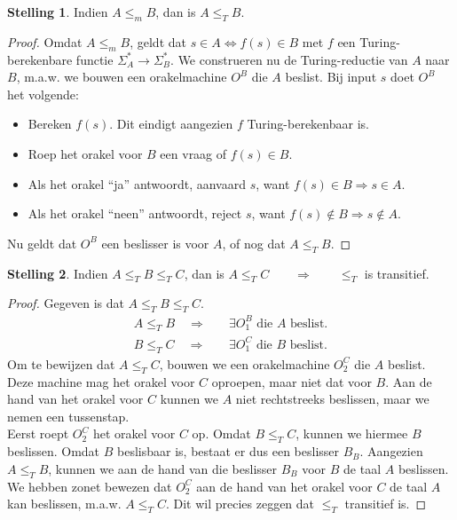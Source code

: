 \documentclass[kulak]{kulakarticle}
\theoremstyle{definition}
\newtheorem*{stelling}{Stelling}
\begin{document}
	\begin{stelling}
		Indien \(A \leq_m B\), dan is \(A \leq_T B\).
	\end{stelling}

	\begin{proof}
		Omdat \(A \leq_m B\), geldt dat \(s\in A \Leftrightarrow f(s)\in B\) met \( f \) een Turing-berekenbare functie \(\Sigma_A^*\to\Sigma_B^*\). We construeren nu de Turing-reductie van \(A\) naar \(B\), m.a.w. we bouwen een orakelmachine \(O^B\) die \(A\) beslist. Bij input \(s\) doet \(O^B\) het volgende:
		\begin{itemize}
			\item Bereken \(f(s)\). Dit eindigt aangezien \(f\) Turing-berekenbaar is.
			\item Roep het orakel voor \(B\) een vraag of \(f(s)\in B\).
			\item Als het orakel ``ja'' antwoordt, aanvaard \(s\), want \(f(s)\in B \Rightarrow s\in A\).
			\item Als het orakel ``neen'' antwoordt, reject \(s\), want \(f(s)\notin B \Rightarrow s\notin A\).
		\end{itemize}
		Nu geldt dat \(O^B\) een beslisser is voor \(A\), of nog dat \(A \leq_T B\).
	\end{proof}

	\newpage
	\begin{stelling}
		Indien \(A \leq_T B \leq_T C\), dan is \(A \leq_T C \qquad \Longrightarrow \qquad \leq_T\) is transitief.
	\end{stelling}

	\begin{proof} Gegeven is dat \(A \leq_T B \leq_T C\).
		\begin{align*}
			A \leq_T B \quad \Longrightarrow \quad &\exists O_1^B \text{ die $A$ beslist}.\\
			B \leq_T C \quad \Longrightarrow \quad &\exists O_1^C \text{ die $B$ beslist}.
		\end{align*}
		Om te bewijzen dat \(A \leq_T C\), bouwen we een orakelmachine \(O_2^C\) die \(A\) beslist. Deze machine mag het orakel voor \(C\) oproepen, maar niet dat voor \(B\). Aan de hand van het orakel voor \(C\) kunnen we \(A\) niet rechtstreeks beslissen, maar we nemen een tussenstap. \hfill \\

		Eerst roept \(O_2^C\) het orakel voor \(C\) op. Omdat \(B \leq_T C\), kunnen we hiermee \(B\) beslissen. Omdat \(B\) beslisbaar is, bestaat er dus een beslisser \(B_B\). Aangezien \(A \leq_T B\), kunnen we aan de hand van die beslisser \(B_B\) voor \(B\) de taal \(A\) beslissen. We hebben zonet bewezen dat \(O_2^C\) aan de hand van het orakel voor \(C\) de taal \(A\) kan beslissen, m.a.w. \(A \leq_T C\). Dit wil precies zeggen dat \(\leq_T\) transitief is.
	\end{proof}
\end{document}
